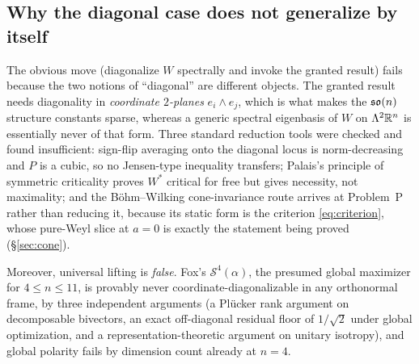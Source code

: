 \subsection{Why the diagonal case does not generalize by itself}

The obvious move (diagonalize $W$ spectrally and invoke the granted result) fails because the two notions of ``diagonal'' are different objects. The granted result needs diagonality in \emph{coordinate $2$-planes} $e_i\wedge e_j$, which is what makes the $\mathfrak{so}(n)$ structure constants sparse, whereas a generic spectral eigenbasis of $W$ on $\Lambda^2\mathbb{R}^n$ is essentially never of that form. Three standard reduction tools were checked and found insufficient: sign-flip averaging onto the diagonal locus is norm-decreasing and $P$ is a cubic, so no Jensen-type inequality transfers; Palais's principle of symmetric criticality proves $W^{*}$ critical for free but gives necessity, not maximality; and the B\"ohm--Wilking cone-invariance route arrives at Problem~P rather than reducing it, because its static form is the criterion \eqref{eq:criterion}, whose pure-Weyl slice at $a=0$ is exactly the statement being proved (\S\ref{sec:cone}).

Moreover, universal lifting is \emph{false}. Fox's $\mathcal S^4(\alpha)$, the presumed global maximizer for $4\le n\le11$, is provably never coordinate-diagonalizable in any orthonormal frame, by three independent arguments (a Pl\"ucker rank argument on decomposable bivectors, an exact off-diagonal residual floor of $1/\sqrt2$ under global optimization, and a representation-theoretic argument on unitary isotropy), and global polarity fails by dimension count already at $n=4$.

